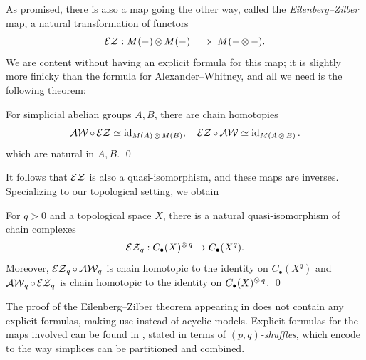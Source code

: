 As promised, there is also a map going the other way, called the \emph{Eilenberg--Zilber} map, a natural transformation of functors
\[\operatorname{\mathcal{EZ}}: M(-)\operatorname{\otimes} M(-)\implies M(-\operatorname{\otimes} -).\]
We are content without having an explicit formula for this map; it is slightly more finicky than the formula for Alexander--Whitney, and all we need is the following theorem:
\begin{thm}\label{thm:eilenberg_zilber}
  For simplicial abelian groups $A,B$, there are chain homotopies 
  \[\operatorname{\mathcal{AW}}\circ \operatorname{\mathcal{EZ}} \simeq \operatorname{id}_{M(A)\operatorname{\otimes} M(B)}, \quad \operatorname{\mathcal{EZ}}\circ\operatorname{\mathcal{AW}} \simeq \operatorname{id}_{M(A\operatorname{\otimes} B)}.\]
  which are natural in $A,B$. \hfill \qed
\end{thm}
It follows that $\operatorname{\mathcal{EZ}}$ is also a quasi-isomorphism, and these maps are inverses. Specializing to our topological setting, we obtain 
\begin{cor}
For $q>0$ and a topological space $X$, there is a natural quasi-isomorphism of chain complexes 
\[\operatorname{\mathcal{EZ}}_q: C_\bullet(X)^{\operatorname{\otimes} q}\to C_\bullet(X^q).\]
Moreover, $\operatorname{\mathcal{EZ}}_q \circ \operatorname{\mathcal{AW}}_q$ is chain homotopic to the identity on $C_\bullet(X^q)$ and $\operatorname{\mathcal{AW}}_q \circ \operatorname{\mathcal{EZ}}_q$ is chain homotopic to the identity on $C_\bullet(X)^{\operatorname{\otimes} q}$. \hfill \qed
\end{cor}
\begin{rem}
The proof of the Eilenberg--Zilber theorem appearing in \cite{Eilenberg1953} does not contain any explicit formulas, making use instead of acyclic models. Explicit formulas for the maps involved can be found in \cite{Eilenberg_MacLane}, stated in terms of \emph{$(p,q)$-shuffles}, which encode to the way simplices can be partitioned and combined.
\end{rem}